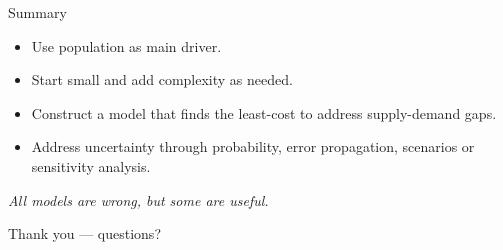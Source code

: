 \documentclass[aspectratio=169, 10pt]{beamer}
\begin{document}
\begin{frame}{Summary}
    \begin{itemize}
        \item Use population as main driver.
        \item Start small and add complexity as needed.
        \item Construct a model that finds the least-cost to address supply-demand gaps.
        \item Address uncertainty through probability, error propagation, scenarios or sensitivity analysis.
    \end{itemize}
    \begin{center}
        \emph{All models are wrong, but some are useful.}
    \end{center}
    \vspace{0.5cm}
    \centering\Large Thank you --- questions?
\end{frame}
\end{document}
